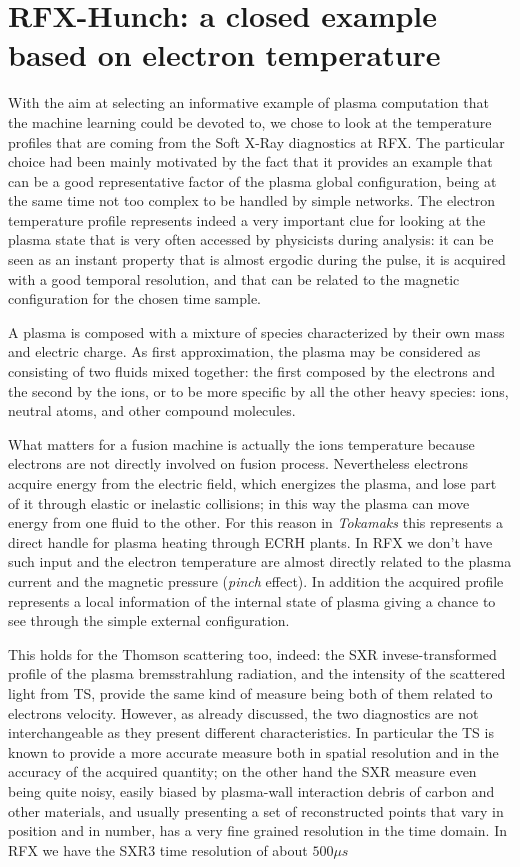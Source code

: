 \chapter{RFX-Hunch: a closed example based on electron temperature}
\label{section:RFXhunch}

With the aim at selecting an informative example of plasma computation that the machine learning could be devoted to, we chose to look at the temperature profiles that are coming from the Soft X-Ray diagnostics at RFX. The particular choice had been mainly motivated by the fact that it provides an example that can be a good representative factor of the plasma global configuration, being at the same time not too complex to be handled by simple networks. The electron temperature profile represents indeed a very important clue for looking at the plasma state that is very often accessed by physicists during analysis: it can be seen as an instant property that is almost ergodic during the pulse, it is acquired with a good temporal resolution, and that can be related to the magnetic configuration for the chosen time sample.

A plasma is composed with a mixture of species characterized by their own mass and electric charge. As first approximation, the plasma may be considered as consisting of two fluids mixed together: the first composed by the electrons and the second by the ions, or to be more specific by all the other heavy species: ions, neutral atoms, and other compound molecules.

What matters for a fusion machine is actually the ions temperature because electrons are not directly involved on fusion process.
Nevertheless electrons acquire energy from the electric field, which energizes the plasma, and lose part of it through elastic or inelastic collisions; in this way the plasma can move energy from one fluid to the other. For this reason in \textit{Tokamaks} this represents a direct handle for plasma heating through \acs{ECRH} plants. In RFX we don't have such input and the electron temperature are almost directly related to the plasma current and the magnetic pressure (\textit{pinch} effect).
In addition the acquired profile represents a local information of the internal state of plasma giving a chance to see through the simple external configuration.

This holds for the Thomson scattering too, indeed: the SXR invese-transformed profile of the plasma bremsstrahlung radiation, and the intensity of the scattered light from TS, provide the same kind of measure being both of them related to electrons velocity.
However, as already discussed, the two diagnostics are not interchangeable as they present different characteristics. In particular the TS is known to provide a more accurate measure both in spatial resolution and in the accuracy of the acquired quantity; on the other hand the SXR measure even being quite noisy, easily biased by plasma-wall interaction debris of carbon and other materials, and usually presenting a set of reconstructed points that vary in position and in number, has a very fine grained resolution in the time domain.
In RFX we have the SXR3 time resolution of about $500 \mu s$

